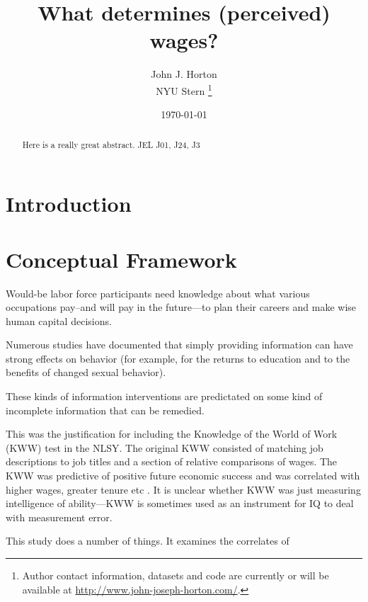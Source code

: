\documentclass[11pt]{article}
\begin{document}
 

\title{What determines (perceived) wages?}

\date{\today}

\author{ John J. Horton \\ NYU Stern \footnote{ Author contact information, datasets and code are currently or will be available at \href{http://www.john-joseph-horton.com/}{http://www.john-joseph-horton.com/}. } }
\maketitle

\begin{abstract}
\noindent  Here is a really great abstract.  \newline
\noindent JEL J01, J24, J3
\end{abstract} 

\section{Introduction}
\section{Conceptual Framework} 

Would-be labor force participants need knowledge about what various occupations pay--and will pay in the future---to plan their careers and make wise human capital decisions. 

Numerous studies have documented that simply providing information can have strong effects on behavior (for example, \cite{jensen2010perceived} for the returns to education and \cite{dupas2009teenagers} to the benefits of changed sexual behavior).  


These kinds of information interventions are predictated on some kind
of incomplete information that can be remedied. 


This was the justification for including the Knowledge of the World of Work (KWW) test in the NLSY. 
The original KWW consisted of matching job descriptions to job titles and a section of relative comparisons of wages. 
The KWW was predictive of positive future economic success and was correlated with higher wages, greater tenure etc \citep{kohen1975133}. 
It is unclear whether KWW was just measuring intelligence of ability---KWW is sometimes used as an instrument for IQ to deal with measurement error. 


This study does a number of things. 
It examines the correlates of 
\end{document}
